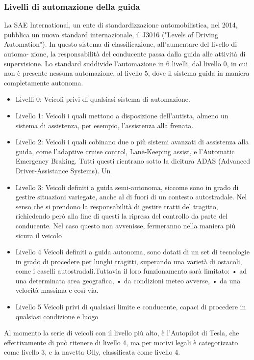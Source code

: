 \documentclass[14pt]{extarticle}
\begin{document}
\subsubsection{Livelli di automazione della guida}
La SAE International, un ente di standardizzazione automobilistica,  nel 2014, pubblica un nuovo standard internazionale, il J3016 ("Levels of Driving Automation").
In questo sistema di classificazione, all’aumentare del livello di automa-
zione, la responsabilità del conducente passa dalla guida alle attività di
supervisione.
Lo standard suddivide l'automazione in 6 livelli, dal livello 0, in cui non è presente nessuna  automazione, al livello 5, dove il sistema guida in maniera completamente autonoma.
\begin{itemize}
\item Livelli 0:
Veicoli privi di qualsiasi sistema di automazione.
\item Livello 1: 
Veicoli  i quali mettono a disposizione dell'autista, almeno un sistema di assistenza, per esempio, l'assistenza alla frenata.
\item Livello 2:
Veicoli i quali cobinano due o più sistemi avanzati di assistenza alla guida, come l'adaptive cruise control, Lane-Keeping assist, e l'Automatic Emergency Braking. Tutti questi rientrano sotto la dicitura ADAS (Advanced Driver-Assistance Systems). Un 
\item Livello 3:
Veicoli definiti a guida semi-autonoma, siccome sono in grado di  gestire situazioni variegate, anche al di fuori di un contesto autostradale. Nel senso che si prendono la responsabilità di gestire tratti del tragitto, richiedendo però alla fine di questi la ripresa del controllo da parte del conducente. Nel caso questo non avvenisse, fermeranno nella maniera più sicura il  veicolo
\item Livello 4
Veicoli definiti a guida autonoma, sono dotati di un set di tecnologie in grado di procedere per lunghi tragitti, superando una varietà di ostacoli, come i caselli autostradali.Tuttavia il loro funzionamento sarà limitato:
• ad una determinata area geografica,
• da condizioni meteo avverse,
• da una velocità massima e così via.
\item Livello 5
Veicoli privi di qualsiasi limite e conducente, capaci di procedere in qualsiasi condizione e luogo
\end{itemize}
Al momento la serie di veicoli con il livello più alto, è l'Autopilot di Tesla, che effettivamente di può ritenere di livello 4, ma per motivi legali è categorizzato come livello 3, e la navetta Olly, classificata come livello 4.
\end{document}
